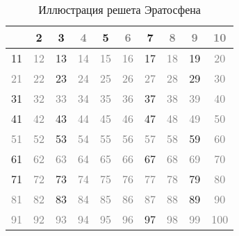 \documentclass[12pt, a4paper, openany]{book}
\begin{document}
\begin{table}[h]
\centering
\begin{tabular}{|c|c|c|c|c|c|c|c|c|c|}
\hline
\textcolor{gray}{} & 2 & 3 & \textcolor{gray}{4} & 5 & \textcolor{gray}{6} & 7 & \textcolor{gray}{8} & \textcolor{gray}{9} & \textcolor{gray}{10} \\
\hline
11 & \textcolor{gray}{12} & 13 & \textcolor{gray}{14} & \textcolor{gray}{15} & \textcolor{gray}{16} & 17 & \textcolor{gray}{18} & 19 & \textcolor{gray}{20} \\
\hline
\textcolor{gray}{21} & \textcolor{gray}{22} & 23 & \textcolor{gray}{24} & \textcolor{gray}{25} & \textcolor{gray}{26} & \textcolor{gray}{27} & \textcolor{gray}{28} & 29 & \textcolor{gray}{30} \\
\hline
31 & \textcolor{gray}{32} & \textcolor{gray}{33} & \textcolor{gray}{34} & \textcolor{gray}{35} & \textcolor{gray}{36} & 37 & \textcolor{gray}{38} & \textcolor{gray}{39} & \textcolor{gray}{40} \\
\hline
41 & \textcolor{gray}{42} & 43 & \textcolor{gray}{44} & \textcolor{gray}{45} & \textcolor{gray}{46} & 47 & \textcolor{gray}{48} & \textcolor{gray}{49} & \textcolor{gray}{50} \\
\hline
\textcolor{gray}{51} & \textcolor{gray}{52} & 53 & \textcolor{gray}{54} & \textcolor{gray}{55} & \textcolor{gray}{56} & \textcolor{gray}{57} & \textcolor{gray}{58} & 59 & \textcolor{gray}{60} \\
\hline
61 & \textcolor{gray}{62} & \textcolor{gray}{63} & \textcolor{gray}{64} & \textcolor{gray}{65} & \textcolor{gray}{66} & 67 & \textcolor{gray}{68} & \textcolor{gray}{69} & \textcolor{gray}{70} \\
\hline
71 & \textcolor{gray}{72} & 73 & \textcolor{gray}{74} & \textcolor{gray}{75} & \textcolor{gray}{76} & \textcolor{gray}{77} & \textcolor{gray}{78} & 79 & \textcolor{gray}{80} \\
\hline
\textcolor{gray}{81} & \textcolor{gray}{82} & 83 & \textcolor{gray}{84} & \textcolor{gray}{85} & \textcolor{gray}{86} & \textcolor{gray}{87} & \textcolor{gray}{88} & 89 & \textcolor{gray}{90} \\
\hline
\textcolor{gray}{91} & \textcolor{gray}{92} & \textcolor{gray}{93} & \textcolor{gray}{94} & \textcolor{gray}{95} & \textcolor{gray}{96} & 97 & \textcolor{gray}{98} & \textcolor{gray}{99} & \textcolor{gray}{100} \\
\hline
\end{tabular}
\caption{Иллюстрация решета Эратосфена}
\end{table}
\end{document}
